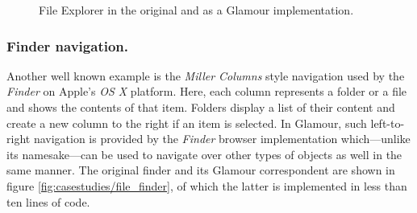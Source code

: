 \documentclass[a4paper,10pt,twoside]{book}
\begin{document}
\begin{figure}[tbp]
\begin{center}
\caption{File Explorer in the original and as a Glamour implementation.}
\label{fig:casestudies/file_explorer}
\end{center}
\end{figure}


\subsubsection{Finder navigation.} Another well known example is the \emph{Miller Columns} style navigation used by the \emph{Finder} on Apple's \emph{OS X} platform. Here, each column represents a folder or a file and shows the contents of that item. Folders display a list of their content and create a new column to the right if an item is selected. In Glamour, such left-to-right navigation is provided by the \emph{Finder} browser implementation which---unlike its namesake---can be used to navigate over other types of objects as well in the same manner. The original finder and its Glamour correspondent are shown in figure \ref{fig:casestudies/file_finder}, of which the latter is implemented in less than ten lines of code.
\end{document}
